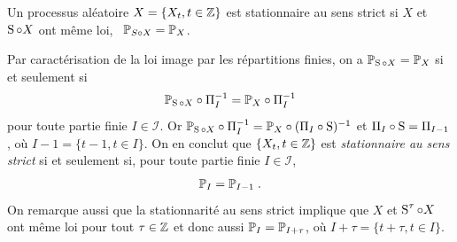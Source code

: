 \begin{definition}
Un processus al\'eatoire $X=\{X_t, t\in \mathbb{Z} \}$ est stationnaire au sens strict si $X$ et $\operatorname{S} \circ X$ ont m\^{e}me loi, \ie\
 $\mathbb{P}_{S\circ X}=\mathbb{P}_X$.
\end{definition}

Par caract\'erisation de la loi image par les r\'epartitions finies, on a  $\mathbb{P}_{\operatorname{S} \circ X}=\mathbb{P}_X$ si et seulement si
$$
\mathbb{P}_{\operatorname{S} \circ X}\circ\Pi_I^{-1}=\mathbb{P}_X\circ\Pi_I^{-1}
$$
pour toute partie finie $I \in \mathcal{I}$.  Or $\mathbb{P}_{\operatorname{S} \circ X}\circ\Pi_I^{-1}=\mathbb{P}_X\circ(\Pi_I\circ \operatorname{S})^{-1}$
et $\Pi_I\circ \operatorname{S}=\Pi_{I-1}$, o\`u $I - 1 = \{ t-1, t \in I \}$.
On en conclut que  $\{X_t, t\in \mathbb{Z}\}$ est \emph{stationnaire au sens strict} si et seulement si, pour toute partie finie $I \in
\mathcal{I}$,
$$
\mathbb{P}_I=\mathbb{P}_{I-1} \; .
$$
On remarque aussi que la stationnarit\'e au sens strict implique que  $X$ et $\operatorname{S}^\tau\circ X$ ont m\^{e}me loi pour tout $\tau\in \mathbb{Z}$
et donc aussi $\mathbb{P}_I=\mathbb{P}_{I+\tau}$, o\`u $I + \tau = \{ t+\tau, t \in I \}$.

